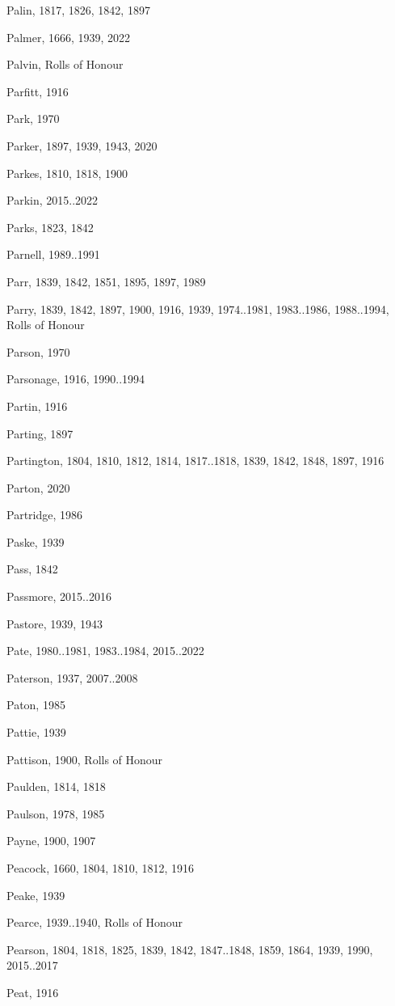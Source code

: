 \begin{theindex}
\item Palin, 1817, 1826, 1842, 1897
\item Palmer, 1666, 1939, 2022
\item Palvin, Rolls of Honour
\item Parfitt, 1916
\item Park, 1970
\item Parker, 1897, 1939, 1943, 2020
\item Parkes, 1810, 1818, 1900
\item Parkin, 2015..2022
\item Parks, 1823, 1842
\item Parnell, 1989..1991
\item Parr, 1839, 1842, 1851, 1895, 1897, 1989
\item Parry, 1839, 1842, 1897, 1900, 1916, 1939, 1974..1981, 1983..1986, 1988..1994, Rolls of Honour
\item Parson, 1970
\item Parsonage, 1916, 1990..1994
\item Partin, 1916
\item Parting, 1897
\item Partington, 1804, 1810, 1812, 1814, 1817..1818, 1839, 1842, 1848, 1897, 1916
\item Parton, 2020
\item Partridge, 1986
\item Paske, 1939
\item Pass, 1842
\item Passmore, 2015..2016
\item Pastore, 1939, 1943
\item Pate, 1980..1981, 1983..1984, 2015..2022
\item Paterson, 1937, 2007..2008
\item Paton, 1985
\item Pattie, 1939
\item Pattison, 1900, Rolls of Honour
\item Paulden, 1814, 1818
\item Paulson, 1978, 1985
\item Payne, 1900, 1907
\item Peacock, 1660, 1804, 1810, 1812, 1916
\item Peake, 1939
\item Pearce, 1939..1940, Rolls of Honour
\item Pearson, 1804, 1818, 1825, 1839, 1842, 1847..1848, 1859, 1864, 1939, 1990, 2015..2017
\item Peat, 1916

\end{theindex}
